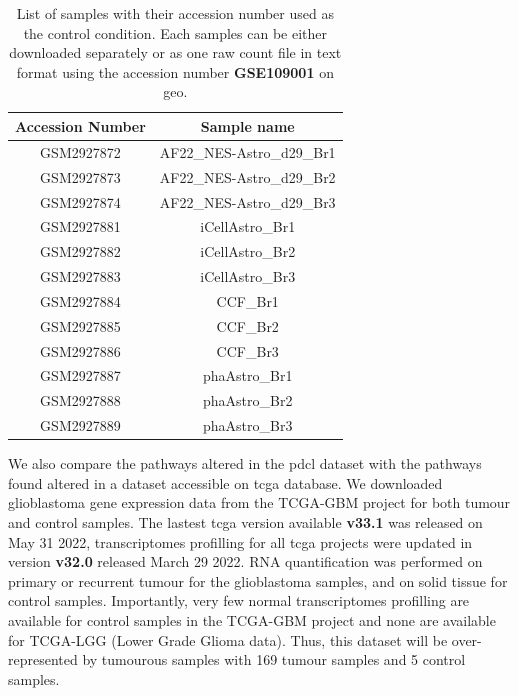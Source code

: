 \begin{table}
    \centering
    \begin{tabular}{ |c|c| }
        \hline
        Accession Number & Sample name \\
        \hline
        GSM2927872 & AF22\_NES-Astro\_d29\_Br1 \\
        GSM2927873 & AF22\_NES-Astro\_d29\_Br2 \\
        GSM2927874 & AF22\_NES-Astro\_d29\_Br3 \\
        \hline
        GSM2927881 & iCellAstro\_Br1 \\
        GSM2927882 & iCellAstro\_Br2 \\
        GSM2927883 & iCellAstro\_Br3 \\
        \hline
        GSM2927884 & CCF\_Br1 \\
        GSM2927885 & CCF\_Br2 \\
        GSM2927886 & CCF\_Br3 \\
        \hline
        GSM2927887 & phaAstro\_Br1 \\ 
        GSM2927888 & phaAstro\_Br2 \\ 
        GSM2927889 & phaAstro\_Br3 \\ 
        \hline
    \end{tabular}
    \caption{
        List of samples with their accession number used as the control condition.
        Each samples can be either downloaded separately or as one raw count file in text format using the accession number \textbf{GSE109001} on \acrshort{geo}.
    }
    \label{table:list-control-samples}
\end{table}

We also compare the pathways altered in the \acrshort{pdcl} dataset with the pathways found altered in a dataset accessible on \acrshort{tcga} database. 
We downloaded glioblastoma gene expression data from the TCGA-GBM project for both tumour and control samples.
The lastest \acrshort{tcga} version available \textbf{v33.1} was released on May 31 2022, transcriptomes profilling for all \acrshort{tcga} projects were updated in version \textbf{v32.0} released March 29 2022.
RNA quantification was performed on primary or recurrent tumour for the glioblastoma samples, and on solid tissue for control samples.
Importantly, very few normal transcriptomes profilling are available for control samples in the TCGA-GBM project and none are available for TCGA-LGG (Lower Grade Glioma data).
Thus, this dataset will be over-represented by tumourous samples with 169 tumour samples and 5 control samples.

